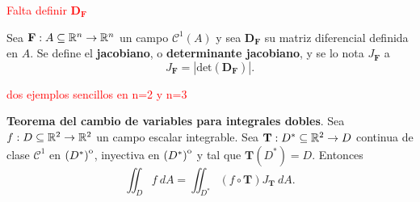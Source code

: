 \textcolor{red}{Falta definir  $\boldsymbol{D}_\mathbf{F}$}


\begin{definition}
    Sea $\mathbf{F}:A\subseteq\mathbb{R}^n\to\mathbb{R}^n$ un campo $\mathcal{C}^1(A)$ y sea $\boldsymbol{D}_\mathbf{F}$ su matriz diferencial definida en $A$. Se define el \textbf{jacobiano}, o \textbf{determinante jacobiano}, y se lo nota $J_\mathbf{F}$ a 
    \[
        J_\mathbf{F}=\left|\text{det}(\boldsymbol{D}_\mathbf{F})\right|.
    \]
\end{definition}


\textcolor{red}{dos ejemplos  sencillos en n=2 y n=3}


\begin{theorem} %
    \textbf{Teorema del cambio de variables para integrales dobles}. Sea $f:D\subseteq\mathbb{R}^2\to\mathbb{R}^2$ un campo escalar integrable. Sea $\mathbf{T}:D^*\subseteq\mathbb{R}^2\to D$ continua de clase $\mathcal{C}^1$ en ${\kern0pt(D^*)}^{\mathrm{o}}$, inyectiva en ${\kern0pt(D^*)}^{\mathrm{o}}$ y tal que $\mathbf{T}(D^*)=D$. Entonces
    \[
        \iint_D f\:dA=\iint_{D^*}(f\circ\mathbf{T})J_\mathbf{T}\:dA.
    \]
\end{theorem}